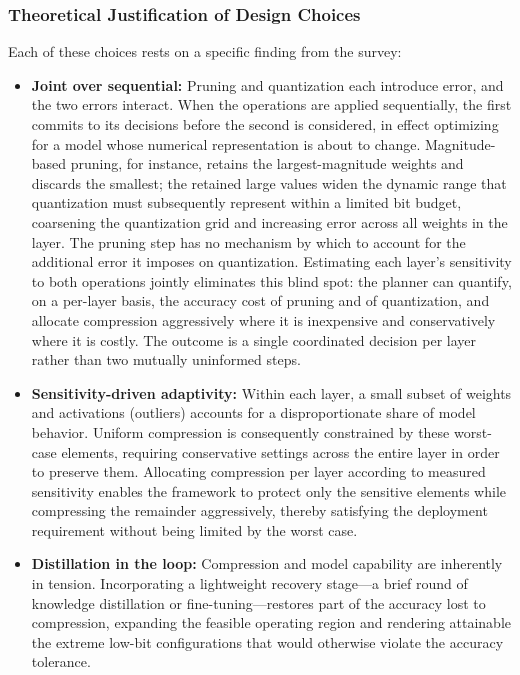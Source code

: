 \subsubsection{Theoretical Justification of Design Choices}

Each of these choices rests on a specific finding from the survey:

\begin{itemize}

  \item \textbf{Joint over sequential:} Pruning and quantization each introduce error, and the two errors interact. When the operations are applied sequentially, the first commits to its decisions before the second is considered, in effect optimizing for a model whose numerical representation is about to change. Magnitude-based pruning, for instance, retains the largest-magnitude weights and discards the smallest; the retained large values widen the dynamic range that quantization must subsequently represent within a limited bit budget, coarsening the quantization grid and increasing error across all weights in the layer. The pruning step has no mechanism by which to account for the additional error it imposes on quantization. Estimating each layer's sensitivity to both operations jointly eliminates this blind spot: the planner can quantify, on a per-layer basis, the accuracy cost of pruning and of quantization, and allocate compression aggressively where it is inexpensive and conservatively where it is costly. The outcome is a single coordinated decision per layer rather than two mutually uninformed steps.

  \item \textbf{Sensitivity-driven adaptivity:} Within each layer, a small subset of weights and activations (outliers) accounts for a disproportionate share of model behavior. Uniform compression is consequently constrained by these worst-case elements, requiring conservative settings across the entire layer in order to preserve them. Allocating compression per layer according to measured sensitivity enables the framework to protect only the sensitive elements while compressing the remainder aggressively, thereby satisfying the deployment requirement without being limited by the worst case.

  \item \textbf{Distillation in the loop:} Compression and model capability are inherently in tension. Incorporating a lightweight recovery stage---a brief round of knowledge distillation or fine-tuning---restores part of the accuracy lost to compression, expanding the feasible operating region and rendering attainable the extreme low-bit configurations that would otherwise violate the accuracy tolerance.


\end{itemize}
